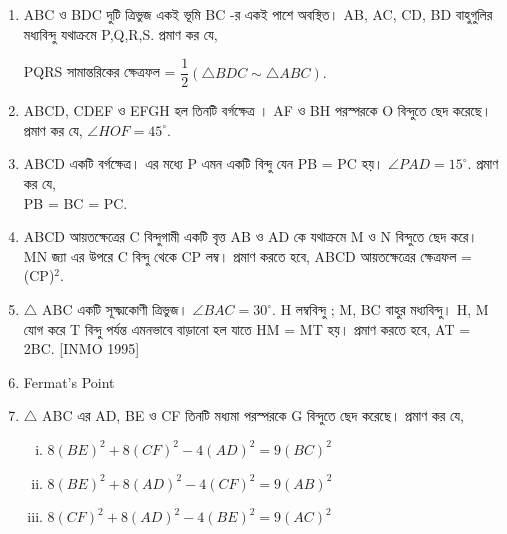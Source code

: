 \documentclass[11pt, a4paper]{article}
\begin{document}
\begin{enumerate}

	\item ABC 
			\textbengali{ও}  
			BDC 
			\textbengali{দুটি ত্রিভুজ একই ভূমি} 
			BC
		   \textbengali{-র একই পাশে অবস্থিত।} 
		   AB, AC, CD, BD 
		   \textbengali{বাহুগুলির মধ্যবিন্দু যথাক্রমে} 
		   P,Q,R,S.
		  \textbengali{প্রমাণ কর যে,} 
		     \begin{center}
		     
		      PQRS
		     \textbengali{ সামান্তরিকের ক্ষেত্রফল =}
		  $ \dfrac{1}{2} \left(\bigtriangleup BDC \sim \bigtriangleup ABC \right). $
		     \end{center}
		    
	\item ABCD, CDEF \textbengali{ও} EFGH \textbengali{হল তিনটি বর্গক্ষেত্র ।} AF \textbengali{ও} BH \textbengali{পরস্পরকে} O \textbengali{বিন্দুতে ছেদ করেছে। প্রমাণ কর যে,} $ \angle HOF = 45^{\circ}. $

	\item ABCD \textbengali{একটি বর্গক্ষেত্র।}  \textbengali{এর মধ্যে } P \textbengali{এমন একটি বিন্দু যেন}  PB = PC \textbengali{হয়।}   $ \angle PAD = 15^{\circ} $. \textbengali{প্রমাণ কর যে,} \\ PB = BC = PC. 

	\item ABCD \textbengali{আয়তক্ষেত্রের}  C \textbengali{বিন্দুগামী একটি বৃত্ত}  AB \textbengali{ও}  AD \textbengali{কে যথাক্রমে}  M \textbengali{ও} N \textbengali{বিন্দুতে ছেদ করে।}  MN \textbengali{জ্যা এর উপরে} C \textbengali{বিন্দু থেকে}  CP \textbengali{লম্ব।} \textbengali{প্রমাণ করতে হবে,} ABCD \textbengali{আয়তক্ষেত্রের ক্ষেত্রফল} = (CP)$^2$.

	\item $\bigtriangleup$ ABC \textbengali{একটি সূক্ষ্মকোণী ত্রিভুজ।}  $\angle BAC = 30^{\circ} $. H \textbengali{লম্ববিন্দু} ; M, BC \textbengali{বাহুর মধ্যবিন্দু।}  H, M \textbengali{যোগ করে} T \textbengali{বিন্দু পর্যন্ত এমনভাবে বাড়ানো হল যাতে}  HM = MT \textbengali{হয়। প্রমাণ করতে হবে,}  AT = 2BC. [INMO 1995]

	\item Fermat's Point

	\item $\bigtriangleup$ ABC \textbengali{এর} AD, BE \textbengali{ও} CF \textbengali{তিনটি মধ্যমা পরস্পরকে}  G \textbengali{বিন্দুতে ছেদ করেছে।}   \textbengali{প্রমাণ কর যে, }
	\begin{enumerate}[(i)]
	\item $8(BE)^2 + 8(CF)^2 - 4(AD)^2 = 9(BC)^2$
	\item $8(BE)^2 + 8(AD)^2 - 4(CF)^2 = 9(AB)^2$	
	\item $8(CF)^2 + 8(AD)^2 - 4(BE)^2 = 9(AC)^2$
	\end{enumerate}
	


\end{enumerate}
\end{document}
